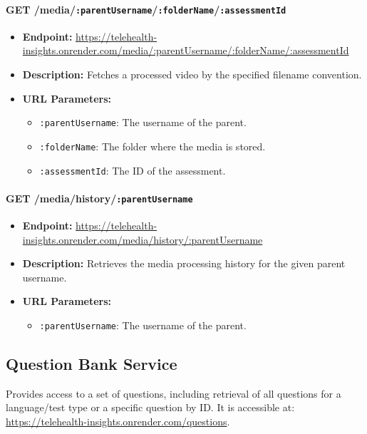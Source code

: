 \documentclass{article}
\begin{document}
  \paragraph{GET /media/\texttt{:parentUsername}/\texttt{:folderName}/\texttt{:assessmentId}}
  \begin{itemize}
      \item \textbf{Endpoint:} 
          \url{https://telehealth-insights.onrender.com/media/:parentUsername/:folderName/:assessmentId}
      \item \textbf{Description:} Fetches a processed video by the specified 
            filename convention.
      \item \textbf{URL Parameters:}
      \begin{itemize}
          \item \texttt{:parentUsername}: The username of the parent.
          \item \texttt{:folderName}: The folder where the media is stored.
          \item \texttt{:assessmentId}: The ID of the assessment.
      \end{itemize}
  \end{itemize}
  
  \paragraph{GET /media/history/\texttt{:parentUsername}}
  \begin{itemize}
      \item \textbf{Endpoint:} 
          \url{https://telehealth-insights.onrender.com/media/history/:parentUsername}
      \item \textbf{Description:} Retrieves the media processing history 
            for the given parent username.
      \item \textbf{URL Parameters:}
      \begin{itemize}
          \item \texttt{:parentUsername}: The username of the parent.
      \end{itemize}
  \end{itemize}
  
  \subsection{Question Bank Service}
  Provides access to a set of questions, including retrieval of all questions 
  for a language/test type or a specific question by ID. It is accessible at: 
  \url{https://telehealth-insights.onrender.com/questions}.
  
\end{document}
